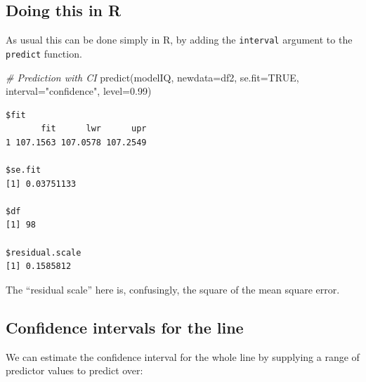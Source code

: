 \documentclass[
  oneside]{krantz}
\newenvironment{Shaded}{\begin{snugshade}}{\end{snugshade}}
\newcommand{\AttributeTok}[1]{\textcolor[rgb]{0.77,0.63,0.00}{#1}}
\newcommand{\CommentTok}[1]{\textcolor[rgb]{0.56,0.35,0.01}{\textit{#1}}}
\newcommand{\ConstantTok}[1]{\textcolor[rgb]{0.00,0.00,0.00}{#1}}
\newcommand{\DecValTok}[1]{\textcolor[rgb]{0.00,0.00,0.81}{#1}}
\newcommand{\FloatTok}[1]{\textcolor[rgb]{0.00,0.00,0.81}{#1}}
\newcommand{\FunctionTok}[1]{\textcolor[rgb]{0.00,0.00,0.00}{#1}}
\newcommand{\NormalTok}[1]{#1}
\newcommand{\OtherTok}[1]{\textcolor[rgb]{0.56,0.35,0.01}{#1}}
\newcommand{\SpecialCharTok}[1]{\textcolor[rgb]{0.00,0.00,0.00}{#1}}
\newcommand{\StringTok}[1]{\textcolor[rgb]{0.31,0.60,0.02}{#1}}
\begin{document}
\hypertarget{doing-this-in-r-28}{%
\subsection{Doing this in R}\label{doing-this-in-r-28}}

As usual this can be done simply in R, by adding the \texttt{interval} argument to the \texttt{predict} function.

\begin{Shaded}
\begin{Highlighting}[]
\CommentTok{\# Prediction with CI }
\FunctionTok{predict}\NormalTok{(modelIQ, }\AttributeTok{newdata=}\NormalTok{df2, }\AttributeTok{se.fit=}\ConstantTok{TRUE}\NormalTok{, }\AttributeTok{interval=}\StringTok{"confidence"}\NormalTok{, }\AttributeTok{level=}\FloatTok{0.99}\NormalTok{)}
\end{Highlighting}
\end{Shaded}

\begin{verbatim}
$fit
       fit      lwr      upr
1 107.1563 107.0578 107.2549

$se.fit
[1] 0.03751133

$df
[1] 98

$residual.scale
[1] 0.1585812
\end{verbatim}

The ``residual scale'' here is, confusingly, the square of the mean square error.

\hypertarget{confidence-intervals-for-the-line}{%
\subsection{Confidence intervals for the line}\label{confidence-intervals-for-the-line}}

We can estimate the confidence interval for the whole line by supplying a range of predictor values to predict over:

\begin{Shaded}
\end{Shaded}
\end{document}
